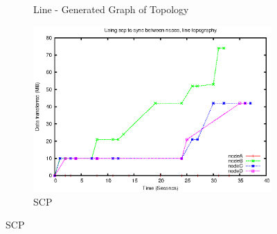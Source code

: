 \documentclass[12pt]{article}
\begin{document}
\begin{figure}[htp]
\begin{subfigure}[b]{0.5\linewidth}
        \caption{Line - Generated Graph of Topology}
        \label{fig:line_graph}
    \end{subfigure}
    \begin{subfigure}[b]{0.5\linewidth}
        \centering
        \includegraphics[scale=0.5]{images/line-scp-10-fixes.eps}
        \caption{SCP}
        \label{fig:line_scp}
    \end{subfigure}


\end{figure}
\end{document}
